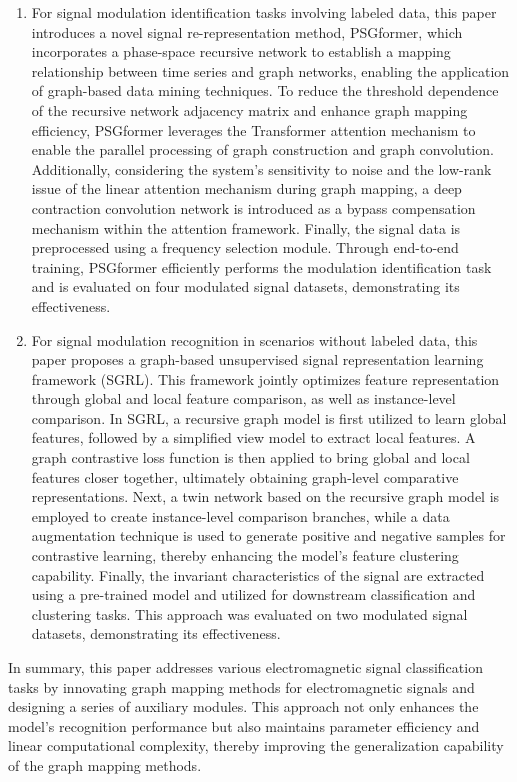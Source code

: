 {\begin{enumerate}
        \item  For signal modulation identification tasks involving labeled data, this paper introduces a novel signal re-representation method, PSGformer, which incorporates a phase-space recursive network to establish a mapping relationship between time series and graph networks, enabling the application of graph-based data mining techniques. To reduce the threshold dependence of the recursive network adjacency matrix and enhance graph mapping efficiency, PSGformer leverages the Transformer attention mechanism to enable the parallel processing of graph construction and graph convolution. Additionally, considering the system’s sensitivity to noise and the low-rank issue of the linear attention mechanism during graph mapping, a deep contraction convolution network is introduced as a bypass compensation mechanism within the attention framework. Finally, the signal data is preprocessed using a frequency selection module. Through end-to-end training, PSGformer efficiently performs the modulation identification task and is evaluated on four modulated signal datasets, demonstrating its effectiveness.
        \item  For signal modulation recognition in scenarios without labeled data, this paper proposes a graph-based unsupervised signal representation learning framework (SGRL). This framework jointly optimizes feature representation through global and local feature comparison, as well as instance-level comparison. In SGRL, a recursive graph model is first utilized to learn global features, followed by a simplified view model to extract local features. A graph contrastive loss function is then applied to bring global and local features closer together, ultimately obtaining graph-level comparative representations. Next, a twin network based on the recursive graph model is employed to create instance-level comparison branches, while a data augmentation technique is used to generate positive and negative samples for contrastive learning, thereby enhancing the model's feature clustering capability. Finally, the invariant characteristics of the signal are extracted using a pre-trained model and utilized for downstream classification and clustering tasks. This approach was evaluated on two modulated signal datasets, demonstrating its effectiveness.
         
    \end{enumerate}
    
    In summary, this paper addresses various electromagnetic signal classification tasks by innovating graph mapping methods for electromagnetic signals and designing a series of auxiliary modules. This approach not only enhances the model's recognition performance but also maintains parameter efficiency and linear computational complexity, thereby improving the generalization capability of the graph mapping methods.
}





 

